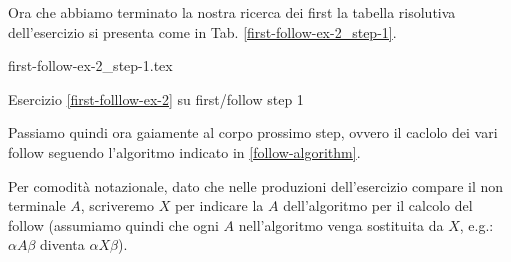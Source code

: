 \documentclass[class=book, crop=false, oneside, 12pt]{standalone}
\begin{document}
Ora che abbiamo terminato la nostra ricerca dei first la tabella risolutiva dell'esercizio si presenta come in Tab. \ref{first-follow-ex-2_step-1}.
\begin{table}[H]
	\centering
	{first-follow-ex-2_step-1.tex}
    \caption{Esercizio \ref{first-folllow-ex-2} su first/follow step 1}
    \label{first-follow-ex-2_step-1}
\end{table}
Passiamo quindi ora gaiamente al corpo prossimo step, ovvero il caclolo dei vari follow seguendo l'algoritmo indicato in \ref{follow-algorithm}.

Per comodità notazionale, dato che nelle produzioni dell'esercizio compare il non terminale \(A\), scriveremo \(X\) per indicare la \(A\) dell'algoritmo per il calcolo del follow (assumiamo quindi che ogni \(A\) nell'algoritmo venga sostituita da \(X\), e.g.: \(\alpha A \beta\) diventa \(\alpha X \beta\)).
\end{document}
